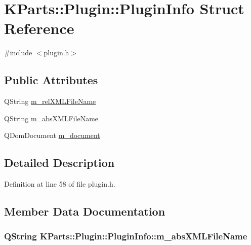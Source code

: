 \hypertarget{structKParts_1_1Plugin_1_1PluginInfo}{\section{\-K\-Parts\-:\-:\-Plugin\-:\-:\-Plugin\-Info \-Struct \-Reference}
\label{structKParts_1_1Plugin_1_1PluginInfo}
}


{\ttfamily \#include $<$plugin.\-h$>$}

\subsection*{\-Public \-Attributes}
\begin{DoxyCompactItemize}
\item 
\-Q\-String \hyperlink{structKParts_1_1Plugin_1_1PluginInfo_a02f9a1972d5e87b2d168fa7c5683649b}{m\-\_\-rel\-X\-M\-L\-File\-Name}
\item 
\-Q\-String \hyperlink{structKParts_1_1Plugin_1_1PluginInfo_a1351095a0ec3842ccf3c49cfd4c97478}{m\-\_\-abs\-X\-M\-L\-File\-Name}
\item 
\-Q\-Dom\-Document \hyperlink{structKParts_1_1Plugin_1_1PluginInfo_a5d8acab9612633d4d1f35019213ecadd}{m\-\_\-document}
\end{DoxyCompactItemize}


\subsection{\-Detailed \-Description}


\-Definition at line 58 of file plugin.\-h.



\subsection{\-Member \-Data \-Documentation}
\hypertarget{structKParts_1_1Plugin_1_1PluginInfo_a1351095a0ec3842ccf3c49cfd4c97478}{
\subsubsection[{m\-\_\-abs\-X\-M\-L\-File\-Name}]{\setlength{\rightskip}{0pt plus 5cm}\-Q\-String {\bf \-K\-Parts\-::\-Plugin\-::\-Plugin\-Info\-::m\-\_\-abs\-X\-M\-L\-File\-Name}}}\label{structKParts_1_1Plugin_1_1PluginInfo_a1351095a0ec3842ccf3c49cfd4c97478}


